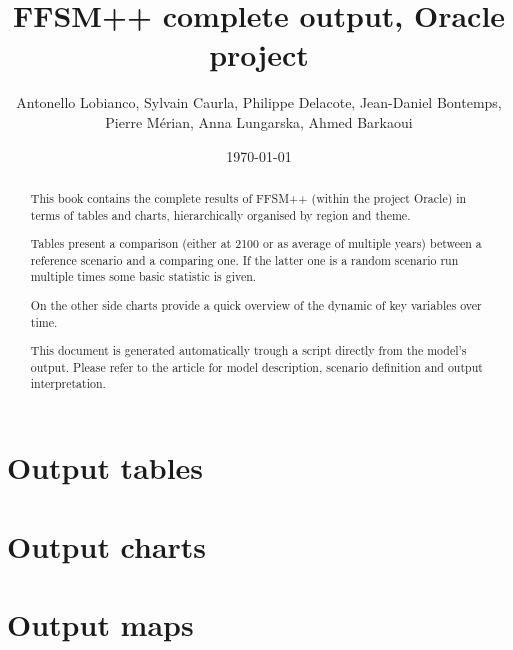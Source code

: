\documentclass[a4paper,11pt]{paper}
\title{FFSM++ complete output, Oracle project}
\author{Antonello Lobianco, Sylvain Caurla, Philippe Delacote, Jean-Daniel Bontemps, Pierre Mérian, Anna Lungarska, Ahmed Barkaoui}
\date{\today}
\begin{document}
\maketitle

\begin{abstract}
This book contains the complete results of FFSM++ (within the project Oracle) in terms of tables and charts, hierarchically organised by region and theme.

Tables present a comparison (either at 2100 or as average of multiple years) between a reference scenario and a comparing one. If the latter one is a random scenario run multiple times some basic statistic is given.

On the other side charts provide a quick overview of the dynamic of key variables over time.

This document is generated automatically trough a script directly from the model's output. Please refer to the article for model description, scenario definition and output interpretation.

\end{abstract}

\thispagestyle{empty}
\newpage
\tableofcontents
\thispagestyle{empty}
\newpage
\part[Tables]{Output tables}

\clearpage
\newpage
\part[Charts]{Output charts}

\clearpage
\newpage
\part[Maps]{Output maps}


%
\end{document}
